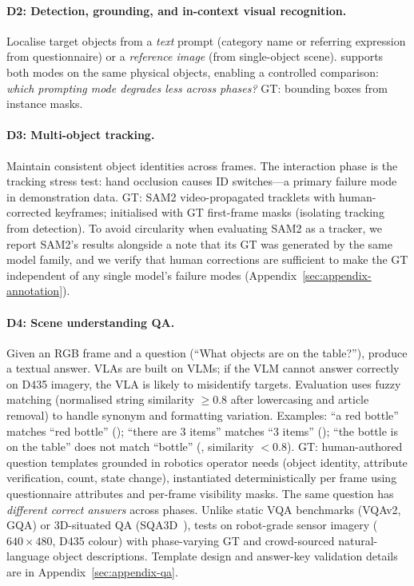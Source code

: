 \paragraph{D2: Detection, grounding, and in-context visual recognition.}
\label{sec:d2-detection-grounding}
Localise target objects from a \textit{text} prompt (category name or referring expression from questionnaire) or a \textit{reference image} (from single-object scene).
\coolname{} supports both modes on the same physical objects, enabling a controlled comparison: \textit{which prompting mode degrades less across phases?}
GT: bounding boxes from instance masks.

\paragraph{D3: Multi-object tracking.}
Maintain consistent object identities across frames.
The interaction phase is the tracking stress test: hand occlusion causes ID switches---a primary failure mode in demonstration data.
GT: SAM2 video-propagated tracklets with human-corrected keyframes; initialised with GT first-frame masks (isolating tracking from detection).
To avoid circularity when evaluating SAM2 as a tracker, we report SAM2's results alongside a note that its GT was generated by the same model family, and we verify that human corrections are sufficient to make the GT independent of any single model's failure modes (Appendix~\ref{sec:appendix-annotation}).

\paragraph{D4: Scene understanding QA.}
Given an RGB frame and a question (``What objects are on the table?''), produce a textual answer.
VLAs are built on VLMs; if the VLM cannot answer correctly on D435 imagery, the VLA is likely to misidentify targets.
Evaluation uses fuzzy matching (normalised string similarity $\geq 0.8$ after lowercasing and article removal) to handle synonym and formatting variation.
Examples: ``a red bottle'' matches ``red bottle'' (\cmark); ``there are 3 items'' matches ``3 items'' (\cmark); ``the bottle is on the table'' does not match ``bottle'' (\xmark, similarity $< 0.8$).
GT: human-authored question templates grounded in robotics operator needs (object identity, attribute verification, count, state change), instantiated deterministically per frame using questionnaire attributes and per-frame visibility masks.
The same question has \textit{different correct answers} across phases.
Unlike static VQA benchmarks (VQAv2, GQA) or 3D-situated QA (SQA3D~\citep{ma2022sqa3d}), \coolname{} tests on robot-grade sensor imagery ($640\!\times\!480$, D435 colour) with phase-varying GT and crowd-sourced natural-language object descriptions.
Template design and answer-key validation details are in Appendix~\ref{sec:appendix-qa}.


